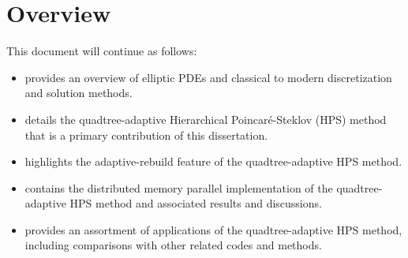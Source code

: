 \section{Overview}

This document will continue as follows:

\begin{itemize}
    \item{ provides an overview of elliptic PDEs and classical to modern discretization and solution methods.}
    \item{ details the quadtree-adaptive Hierarchical Poincaré-Steklov (HPS) method that is a primary contribution of this dissertation.}
    \item{ highlights the adaptive-rebuild feature of the quadtree-adaptive HPS method.}
    \item{ contains the distributed memory parallel implementation of the quadtree-adaptive HPS method and associated results and discussions.}
    \item{ provides an assortment of applications of the quadtree-adaptive HPS method, including comparisons with other related codes and methods.}
\end{itemize}